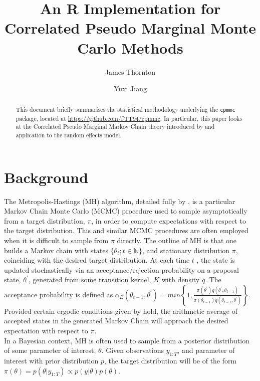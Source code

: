 \documentclass{article}
\title{An R Implementation for Correlated Pseudo Marginal Monte Carlo Methods}
\author{James Thornton \and Yuxi Jiang}
\begin{document}



\maketitle

\begin{abstract}
This document briefly summarises the statistical methodology underlying the \texttt{cpmmc} package, located at \url{https://github.com/JTT94/cpmmc}. In particular, this paper looks at the Correlated Pseudo Marginal Markov Chain theory introduced by \cite{cpmmDeligiannidis2015} and application to the random effects model.
\end{abstract}

\section{Background}

The Metropolis-Hastings (MH) algorithm, detailed fully by \cite{roberts2004}, is a particular Markov Chain Monte Carlo (MCMC) procedure used to sample asymptotically from a target distribution, $\pi$, in order to compute expectations with respect to the target distribution. This and similar MCMC procedures are often employed when it is difficult to sample from $\pi$ directly. The outline of MH is that one builds a Markov chain with states $\{\theta_t ; t \in \mathbb{N}\}$, and stationary distribution $\pi$, coinciding with the desired target distribution. At each time $ t $ , the state is updated stochastically via an acceptance/rejection probability on a proposal state, $\theta^\prime$, generated from some transition kernel, $K$ with density $q$. The acceptance probability is defined as  $ \alpha_E(\theta_{t-1}, \theta^\prime) = min\left\{1,  \frac{
                \pi(\theta^\prime) q(\theta^\prime, \theta_{t-1})}
                {\pi(\theta_{t-1}) q(\theta_{t-1}, \theta^\prime)}
\right\} $. Provided certain ergodic conditions given by \cite{roberts2004} hold, the arithmetic average of accepted states in the generated Markov Chain will approach the desired expectation with respect to $\pi$. \\

In a Bayesian context, MH is often used to sample from a posterior distribution of some parameter of interest, $\theta$. Given observations $y_{1:T}$, and parameter of interest with prior distribution $p$, the target distribution will be of the form $\pi (\theta) = p(\theta | y_{1:T} ) \propto p(y|\theta) p(\theta)$.\\
\end{document}
